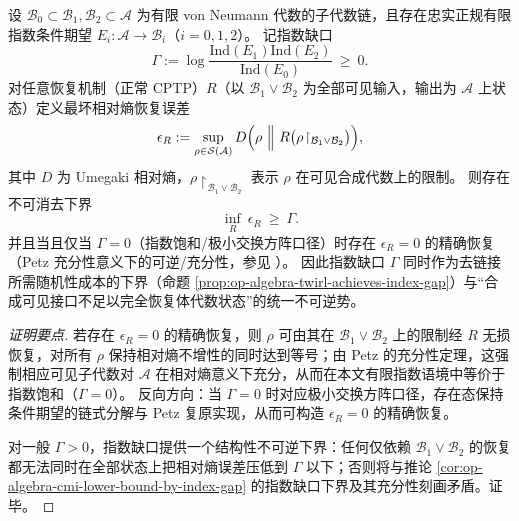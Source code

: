 \begin{proposition}\label{prop:op-algebra-minimal-sufficiency-gap-by-index}
设 \(\mathcal{B}_0\subset \mathcal{B}_1,\mathcal{B}_2\subset \mathcal{A}\) 为有限 von Neumann 代数的子代数链，且存在忠实正规有限指数条件期望
\(
E_i:\mathcal{A}\to\mathcal{B}_i
\)（\(i=0,1,2\)）。
记指数缺口
\[
\Gamma:=\log\frac{\mathrm{Ind}(E_1)\mathrm{Ind}(E_2)}{\mathrm{Ind}(E_0)}\ \ge\ 0.
\]
对任意恢复机制（正常 CPTP）\(R\)（以 \(\mathcal{B}_1\vee\mathcal{B}_2\) 为全部可见输入，输出为 \(\mathcal{A}\) 上状态）定义最坏相对熵恢复误差
\[
\epsilon_R:=\sup_{\rho\in\mathcal{S}(\mathcal{A})}
D\Bigl(\rho\ \Big\|\ R\bigl(\rho\!\upharpoonright_{\mathcal{B}_1\vee\mathcal{B}_2}\bigr)\Bigr),
\]
其中 \(D\) 为 Umegaki 相对熵，\(\rho\!\upharpoonright_{\mathcal{B}_1\vee\mathcal{B}_2}\) 表示 \(\rho\) 在可见合成代数上的限制。
则存在不可消去下界
\[
\boxed{\;
\inf_R\ \epsilon_R\ \ge\ \Gamma.\;}
\]
并且当且仅当 \(\Gamma=0\)（指数饱和/极小交换方阵口径）时存在 \(\epsilon_R=0\) 的精确恢复（Petz 充分性意义下的可逆/充分性，参见 \cite{Petz1986SufficientSubalgebrasRelativeEntropy,Petz2003MonotonicityRelativeEntropyRevisited}）。
因此指数缺口 \(\Gamma\) 同时作为去链接所需随机性成本的下界（命题 \ref{prop:op-algebra-twirl-achieves-index-gap}）与“合成可见接口不足以完全恢复体代数状态”的统一不可逆势。
\end{proposition}
\begin{proof}[证明要点]
若存在 \(\epsilon_R=0\) 的精确恢复，则 \(\rho\) 可由其在 \(\mathcal{B}_1\vee\mathcal{B}_2\) 上的限制经 \(R\) 无损恢复，对所有 \(\rho\) 保持相对熵不增性的同时达到等号；由 Petz 的充分性定理，这强制相应可见子代数对 \(\mathcal{A}\) 在相对熵意义下充分，从而在本文有限指数语境中等价于指数饱和（\(\Gamma=0\)）。
反向方向：当 \(\Gamma=0\) 时对应极小交换方阵口径，存在态保持条件期望的链式分解与 Petz 复原实现，从而可构造 \(\epsilon_R=0\) 的精确恢复。
\par
对一般 \(\Gamma>0\)，指数缺口提供一个结构性不可逆下界：任何仅依赖 \(\mathcal{B}_1\vee\mathcal{B}_2\) 的恢复都无法同时在全部状态上把相对熵误差压低到 \(\Gamma\) 以下；否则将与推论 \ref{cor:op-algebra-cmi-lower-bound-by-index-gap} 的指数缺口下界及其充分性刻画矛盾。证毕。
\end{proof}

\endinput



